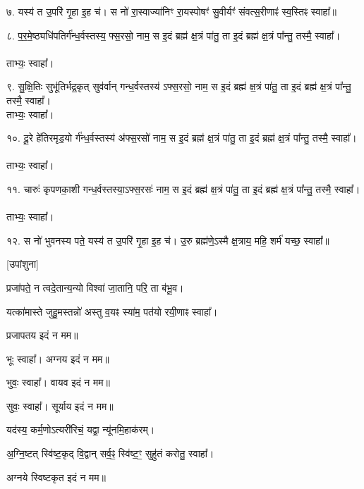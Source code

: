 ७.  यस्य॑ त उ॒परि॑ गृ॒हा इ॒ह च॑।
स नो॑ रा॒स्वाज्या॑निꣳ रा॒यस्पोषꣳ॑ सु॒वीर्यꣳ॑ संवत्स॒रीणाꣴ॑ स्व॒स्तिꣴ स्वाहा᳚॥

८. प॒र॒मे॒ष्ठ्यधि॑पतिर्ग॑न्ध॒र्वस्तस्य॒ फ्स॒रसो॒  नाम॒
स इ॒दं ब्रह्म॑ क्ष॒त्रं पा॑तु॒ ता इ॒दं ब्रह्म॑ क्ष॒त्रं पा᳚न्तु॒ तस्मै॒ स्वाहा᳚।\\
\\
ताभ्यः॒ स्वाहा᳚।

९. सु॒क्षि॒तिः सुभू॑तिर्भद्र॒कृत् सुव॑र्वान्  गन्ध॒र्वस्तस्य॑ ऽफ्स॒रसो॒  नाम॒
स इ॒दं ब्रह्म॑ क्ष॒त्रं पा॑तु॒ ता इ॒दं ब्रह्म॑ क्ष॒त्रं पा᳚न्तु॒ तस्मै॒ स्वाहा᳚।
\\
ताभ्यः॒ स्वाहा᳚।

१०. दू॒रे हे॑तिरमृड॒यो र्ग॑न्ध॒र्वस्तस्य॑  अ॑फ्स॒रसो॑  नाम॒
स इ॒दं ब्रह्म॑ क्ष॒त्रं पा॑तु॒ ता इ॒दं ब्रह्म॑ क्ष॒त्रं पा᳚न्तु॒ तस्मै॒ स्वाहा᳚।\\
\\
ताभ्यः॒ स्वाहा᳚।

११. चारुः॑ कृपणका॒शी  गन्ध॒र्वस्तस्या॒\-ऽफ्स॒रसः॑ नाम॒
स इ॒दं ब्रह्म॑ क्ष॒त्रं पा॑तु॒ ता इ॒दं ब्रह्म॑ क्ष॒त्रं पा᳚न्तु॒ तस्मै॒ स्वाहा᳚।\\
\\
ताभ्यः॒ स्वाहा᳚।

१२. स नो॑ भुवनस्य पते॒ यस्य॑ त उ॒परि॑ गृ॒हा इ॒ह च॑।
उ॒रु ब्रह्म॑णे॒ऽस्मै क्ष॒त्राय॒ महि॒ शर्म॑ यच्छ॒ स्वाहा᳚॥\\
\endgroup

[उपांशुना]

प्रजा॑पते॒ न त्वदे॒तान्य॒न्यो विश्वा॑ जा॒तानि॒ परि॒ ता ब॑भू॒व।

यत्का॑मास्ते जुहु॒मस्तन्नो॑ अस्तु व॒यꣴ स्या॑म॒ पत॑यो रयी॒णाꣴ स्वाहा᳚।

प्रजापतय इदं न मम॥

भूः स्वाहा᳚। अग्नय इदं न मम॥

भुवः॒ स्वाहा᳚। वायव इदं न मम॥

सुवः॒ स्वाहा᳚। सूर्याय इदं न मम॥

यद॑स्य॒ कर्म॒णोऽत्यरी॑रिचं॒ यद्वा॒ न्यू॑नमि॒हाक॑रम्।

अ॒ग्नि॒ष्टत् स्वि॑ष्ट॒कृद् वि॒द्वान् सर्व॒ꣴ॒ स्वि॑ष्ट॒ꣳ॒ सुहु॑तं करोतु॒ स्वाहा᳚।

अग्नये स्विष्टकृत इदं न मम॥

\hyperref[sec:start_Jayadi]{\closesection}